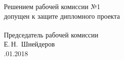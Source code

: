 \newpage
\begin{titlepage}
    \null
    \vfill
    \begin{flushleft}
      \begin{minipage}{0.5\textwidth}
        Решением рабочей комиссии №1\\
        допущен к защите дипломного проекта\\
        \\
        Председатель рабочей комиссии\\
        \underline{\hspace*{2.8cm}} Е.\,Н.~Шнейдеров \\
        \underline{\hspace*{1.2cm}}.01.2018
      \end{minipage}\\[2.2em]
    \end{flushleft}
\end{titlepage}


\pagestyle{empty}
\newpage


\newpage
\pagestyle{fancy}

